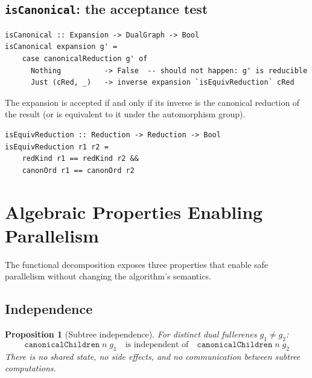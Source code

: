 \documentclass[11pt,a4paper]{article}
\newtheorem{proposition}[theorem]{Proposition}
\theoremstyle{definition}
\begin{document}
\subsection{\texttt{isCanonical}: the acceptance test}

\begin{lstlisting}
isCanonical :: Expansion -> DualGraph -> Bool
isCanonical expansion g' =
    case canonicalReduction g' of
      Nothing          -> False  -- should not happen: g' is reducible
      Just (cRed, _)   -> inverse expansion `isEquivReduction` cRed
\end{lstlisting}

The expansion is accepted if and only if its inverse is the canonical
reduction of the result (or is equivalent to it under the automorphism
group).

\begin{lstlisting}
isEquivReduction :: Reduction -> Reduction -> Bool
isEquivReduction r1 r2 =
    redKind r1 == redKind r2 &&
    canonOrd r1 == canonOrd r2
\end{lstlisting}

\section{Algebraic Properties Enabling Parallelism}
\label{sec:parallel}

The functional decomposition exposes three properties that enable
safe parallelism without changing the algorithm's semantics.

\subsection{Independence}

\begin{proposition}[Subtree independence]
For distinct dual fullerenes $g_1 \neq g_2$:
\[
  \texttt{canonicalChildren}\; n\; g_1
  \quad\text{is independent of}\quad
  \texttt{canonicalChildren}\; n\; g_2
\]
There is no shared state, no side effects, and no communication
between subtree computations.
\end{proposition}
\end{document}
